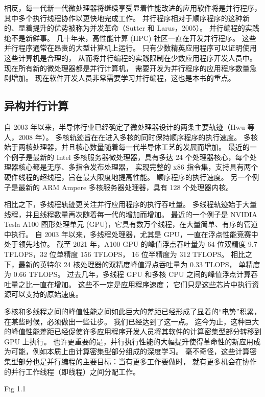 相反，每一代新一代微处理器将继续享受显着性能改进的应用软件将是并行程序，其中多个执行线程协作以更快地完成工作。 
并行程序相对于顺序程序的这种新的、显着提升的优势被称为并发革命（Sutter 和 Larus，2005）。 
并行编程的实践绝不是新鲜事。 几十年来，高性能计算 (HPC) 社区一直在开发并行程序。 
这些并行程序通常在昂贵的大型计算机上运行。 只有少数精英应用程序可以证明使用这些计算机是合理的，
从而将并行编程的实践限制在少数应用程序开发人员中。 现在所有新的微处理器都是并行计算机，
需要开发为并行程序的应用程序数量急剧增加。 现在软件开发人员非常需要学习并行编程，这也是本书的重点。

\subsection{异构并行计算}
自 2003 年以来，半导体行业已经确定了微处理器设计的两条主要轨迹（Hwu 等人，2008 年）。 
多核轨迹旨在在进入多核的同时保持顺序程序的执行速度。 多核始于两核处理器，并且核心数量随着每一代半导体工艺的发展而增加。 
最近的一个例子是最新的 Intel 多核服务器微处理器，具有多达 24 个处理器核心，每个处理器核心都是无序、多指令发布处理器，
实现完整的 x86 指令集，支持具有两个硬件线程的超线程，旨在最大限度地提高性能。 顺序程序的执行速度。 
另一个例子是最新的 ARM Ampere 多核服务器处理器，具有 128 个处理器内核。

相比之下，多线程轨迹更关注并行应用程序的执行吞吐量。 多线程轨迹始于大量线程，并且线程数量再次随着每一代的增加而增加。 
最近的一个例子是 NVIDIA Tesla A100 图形处理单元 (GPU)，它具有数万个线程，在大量简单、有序的管道中执行。 
自 2003 年以来，多线程处理器，尤其是 GPU，一直在浮点性能竞赛中处于领先地位。
截至 2021 年，A100 GPU 的峰值浮点吞吐量为 64 位双精度 9.7 TFLOPS，32 位单精度 156 TFLOPS，
16 位半精度为 312 TFLOPS。 相比之下，最新的英特尔 24 核处理器的双精度峰值浮点吞吐量为 0.33 TLOPS，
单精度为 0.66 TFLOPS。 过去几年，多线程 GPU 和多核 CPU 之间的峰值浮点计算吞吐量之比一直在增加。 
这些不一定是应用程序速度； 它们只是这些芯片中执行资源可以支持的原始速度。

多核和多线程之间的峰值性能之间如此巨大的差距已经形成了显着的“电势”积累，在某些时候，必须做出一些让步。 
我们已经达到了这一点。 迄今为止，这种巨大的峰值性能差距已经促使许多应用程序开发人员将其软件的计算密集型部分转移到 
GPU 上执行。 也许更重要的是，并行执行性能的大幅提升使得革命性的新应用成为可能，例如本质上由计算密集型部分组成的深度学习。 
毫不奇怪，这些计算密集型部分也是并行编程的主要目标：当有更多工作要做时，
就有更多机会在协作的并行工作线程（即线程）之间分配工作。

{\color{red} Fig 1.1}

